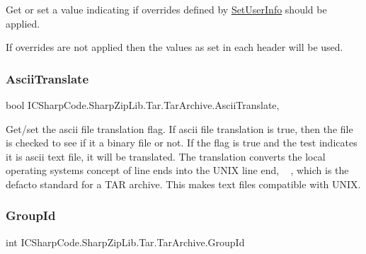 Get or set a value indicating if overrides defined by \hyperlink{class_i_c_sharp_code_1_1_sharp_zip_lib_1_1_tar_1_1_tar_archive_aa791e3eeee7dfc8aedd1a514f1bc08e0}{Set\+User\+Info} should be applied. 

If overrides are not applied then the values as set in each header will be used.\mbox{\label{class_i_c_sharp_code_1_1_sharp_zip_lib_1_1_tar_1_1_tar_archive_a67f9d3a698907b28218d9e0f97edfb9d}} 
\subsubsection{\texorpdfstring{Ascii\+Translate}{AsciiTranslate}}
{\footnotesize\ttfamily bool I\+C\+Sharp\+Code.\+Sharp\+Zip\+Lib.\+Tar.\+Tar\+Archive.\+Ascii\+Translate\hspace{0.3cm}{\ttfamily [get]}, {\ttfamily [set]}}



Get/set the ascii file translation flag. If ascii file translation is true, then the file is checked to see if it a binary file or not. If the flag is true and the test indicates it is ascii text file, it will be translated. The translation converts the local operating system\textquotesingle{}s concept of line ends into the U\+N\+IX line end, \textquotesingle{}~\newline
\textquotesingle{}, which is the defacto standard for a T\+AR archive. This makes text files compatible with U\+N\+IX. 

\mbox{\label{class_i_c_sharp_code_1_1_sharp_zip_lib_1_1_tar_1_1_tar_archive_a19f1b52f370508fcdc0785f3eb9202a8}} 
\subsubsection{\texorpdfstring{Group\+Id}{GroupId}}
{\footnotesize\ttfamily int I\+C\+Sharp\+Code.\+Sharp\+Zip\+Lib.\+Tar.\+Tar\+Archive.\+Group\+Id\hspace{0.3cm}{\ttfamily [get]}}



